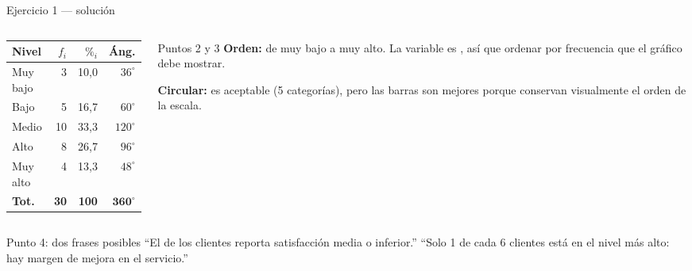 \documentclass[aspectratio=169,10pt]{beamer}
\begin{document}
\begin{frame}{Ejercicio 1 — solución}
  \footnotesize
  \begin{columns}[T,onlytextwidth]
    \begin{column}{0.44\textwidth}
      \centering\scriptsize
      \begin{tabular}{@{}lrrr@{}}
        \toprule
        \textbf{Nivel} & \textbf{$f_i$} & \textbf{$\%_i$} & \textbf{Áng.} \\
        \midrule
        Muy bajo & 3 & 10{,}0 & $36^\circ$ \\
        Bajo     & 5 & 16{,}7 & $60^\circ$ \\
        Medio    & 10 & 33{,}3 & $120^\circ$ \\
        Alto     & 8 & 26{,}7 & $96^\circ$ \\
        Muy alto & 4 & 13{,}3 & $48^\circ$ \\
        \midrule
        \textbf{Tot.} & \textbf{30} & \textbf{100} & $\mathbf{360^\circ}$ \\
        \bottomrule
      \end{tabular}
    \end{column}
    \begin{column}{0.53\textwidth}
      \begin{exampleblock}{Puntos 2 y 3}
        \scriptsize
        \textbf{Orden:} de muy bajo a muy alto. La variable es ,
        así que ordenar por frecuencia 
        que el gráfico debe mostrar.

        \vspace{0.1cm}
        \textbf{Circular:} es aceptable (5 categorías), pero las barras son
        mejores porque conservan visualmente el orden de la escala.
      \end{exampleblock}
    \end{column}
  \end{columns}

  \vspace{0.1cm}
  \begin{alertblock}{Punto 4: dos frases posibles}
    \scriptsize
    ``El  de los clientes reporta satisfacción media o
    inferior.'' \quad ``Solo 1 de cada 6 clientes está en el nivel más alto:
    hay margen de mejora en el servicio.''
  \end{alertblock}
\end{frame}

\end{document}
